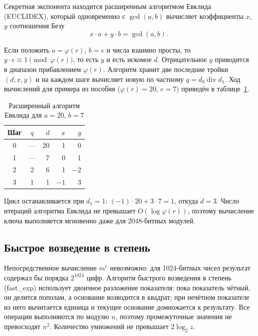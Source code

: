 \documentclass[14pt,a4paper]{extarticle}
\begin{document}
Секретная экспонента находится расширенным алгоритмом Евклида (EUCLIDEX), который
одновременно с $\gcd(a, b)$ вычисляет коэффициенты $x$, $y$ соотношения Безу
\begin{equation}
x \cdot a + y \cdot b = \gcd(a, b).
\end{equation}

Если положить $a = \varphi(r)$, $b = e$ и числа взаимно просты, то
$y \cdot e \equiv 1 \pmod{\varphi(r)}$, то есть $y$ и есть искомое $d$. Отрицательное
$y$ приводится в диапазон прибавлением $\varphi(r)$. Алгоритм хранит две последние
тройки $(d, x, y)$ и на каждом шаге вычисляет новую по частному $q = d_0 \operatorname{div} d_1$.
Ход вычислений для примера из пособия ($\varphi(r) = 20$, $e = 7$) приведён в
таблице~\ref{tab:euclid}.

\begin{table}[H]
\caption{Расширенный алгоритм Евклида для $a = 20$, $b = 7$}
\label{tab:euclid}
\centering
\begin{tabular}{ccrrr}
\toprule
Шаг & $q$ & $d$ & $x$ & $y$ \\
\midrule
0 & --- & 20 & 1 & 0 \\
1 & --- & 7 & 0 & 1 \\
2 & 2 & 6 & 1 & $-2$ \\
3 & 1 & 1 & $-1$ & 3 \\
\bottomrule
\end{tabular}
\end{table}

Цикл останавливается при $d_1 = 1$: $(-1) \cdot 20 + 3 \cdot 7 = 1$, откуда $d = 3$.
Число итераций алгоритма Евклида не превышает $O(\log \varphi(r))$, поэтому вычисление
ключа выполняется мгновенно даже для 2048-битных модулей.

\subsection{Быстрое возведение в степень}

Непосредственное вычисление $m^e$ невозможно: для 1024-битных чисел результат
содержал бы порядка $2^{1024}$ цифр. Алгоритм быстрого возведения в степень
(fast\_exp) использует двоичное разложение показателя: пока показатель чётный, он
делится пополам, а основание возводится в квадрат; при нечётном показателе из него
вычитается единица и текущее основание домножается к результату. Все операции
выполняются по модулю $n$, поэтому промежуточные значения не превосходят $n^2$.
Количество умножений не превышает $2 \log_2 z$.
\end{document}
